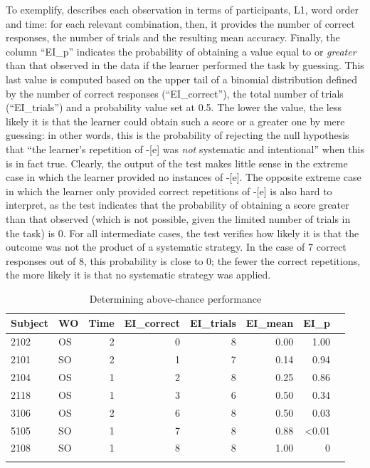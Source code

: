 To exemplify,  describes each observation in terms of participants, L1, word order and time: for each relevant combination, then, it provides the number of correct responses, the number of trials and the resulting mean accuracy. Finally, the column “EI\_p” indicates the probability of obtaining a value equal to or \textit{greater} than that observed in the data if the learner performed the task by guessing. This last value is computed based on the upper tail of a binomial distribution defined by the number of correct responses (“EI\_correct”), the total number of trials (“EI\_trials”) and a probability value set at 0.5. The lower the value, the less likely it is that the learner could obtain such a score or a greater one by mere guessing: in other words, this is the probability of rejecting the null hypothesis that “the learner’s repetition of -[e] was \textit{not} systematic and intentional” when this is in fact true. Clearly, the output of the test makes little sense in the extreme case in which the learner provided no instances of -[e]. The opposite extreme case in which the learner only provided correct repetitions of -[e] is also hard to interpret, as the test indicates that the probability of obtaining a score greater than that observed (which is not possible, given the limited number of trials in the task) is 0. For all intermediate cases, the test verifies how likely it is that the outcome was not the product of a systematic strategy. In the case of 7 correct responses out of 8, this probability is close to 0; the fewer the correct repetitions, the more likely it is that no systematic strategy was applied.

\begin{table}
    \begin{tabularx}{\textwidth}{XXrrrrrr}
    \lsptoprule
     Subject & WO & Time & EI\_correct & EI\_trials & EI\_mean & EI\_p\\
     \midrule
     2102 & OS & 2 & 0 & 8 & 0.00 & 1.00\\
     2101 & SO & 2 & 1 & 7 & 0.14 & 0.94\\
     2104 & OS & 1 & 2 & 8 & 0.25 & 0.86\\
     2118 & OS & 1 & 3 & 6 & 0.50 & 0.34\\
     3106 & OS & 2 & 6 & 8 & 0.50 & 0.03\\
     5105 & SO & 1 & 7 & 8 & 0.88 & <0.01\\
     2108 & SO & 1 & 8 & 8 & 1.00 & 0\\
    \lspbottomrule
    \end{tabularx}
    \caption{Determining above-chance performance}
    \label{tab:04:6}
\end{table}

